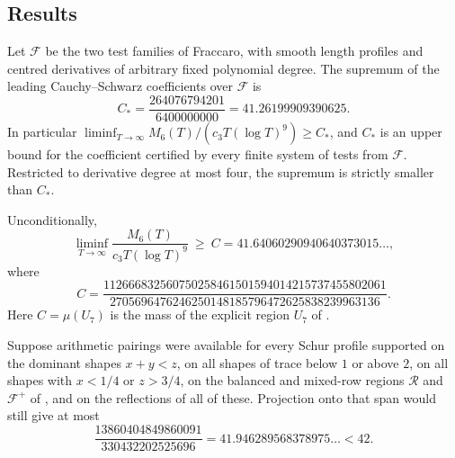 \documentclass[11pt,colorlinks]{charlie}
\begin{document}
\subsection{Results}
\begin{theorem}\label{thm:twofamily}
Let $\mathcal F$ be the two test families of Fraccaro, with smooth length profiles and centred derivatives of arbitrary fixed polynomial degree. The supremum of the leading Cauchy--Schwarz coefficients over $\mathcal F$ is
\[
 C_*=\frac{264076794201}{6400000000}=41.26199909390625 .
\]
In particular $\liminf_{T\to\infty}M_6(T)/(c_3T(\log T)^9)\ge C_*$, and $C_*$ is an upper bound for the coefficient certified by every finite system of tests from $\mathcal F$. Restricted to derivative degree at most four, the supremum is strictly smaller than $C_*$.
\end{theorem}

\begin{theorem}\label{thm:main}
Unconditionally,
\[
 \liminf_{T\to\infty}\frac{M_6(T)}{c_3T(\log T)^9}\ \ge\ C=41.64060290940640373015\ldots,
\]
where
\[
 C=\frac{112666832560750258461501594014215737455802061}{2705696476246250148185796472625838239963136}.
\]
Here $C=\mu(U_7)$ is the mass of the explicit region $U_7$ of .
\end{theorem}

\begin{proposition}\label{prop:ceiling}
Suppose arithmetic pairings were available for every Schur profile supported on the dominant shapes $x+y<z$, on all shapes of trace below $1$ or above $2$, on all shapes with $x<1/4$ or $z>3/4$, on the balanced and mixed-row regions $\mathcal R$ and $\mathcal F^+$ of , and on the reflections of all of these. Projection onto that span would still give at most
\[
 \frac{13860404849860091}{330432202525696}=41.946289568378975\ldots<42 .
\]
\end{proposition}
\end{document}
